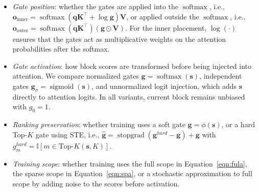 {\setlength{\leftmargini}{2em}
\begin{itemize}
 \item  \textit{Gate position}: whether the gates are applied into the $\operatorname{softmax}$, i.e., $\mathbf{o}_{\text{inner}}=\operatorname{softmax}(\mathbf{q}\mathbf{K}^{\top}+\log\mathbf{g})\mathbf{V}$, or applied outside the $\operatorname{softmax}$, i.e., $\mathbf{o}_{\text{outer}}=\operatorname{softmax}(\mathbf{q}\mathbf{K}^{\top})(\mathbf{g}\odot\mathbf{V})$. For the inner placement, $\log(\cdot)$ ensures that the gates act as multiplicative weights on the attention probabilities after the softmax.

 \item \textit{Gate activation}: how block scores are transformed before being injected into attention. We compare normalized gates $\mathbf{g}=\operatorname{softmax}(\mathbf{s})$, independent gates $\mathbf{g}_{\sigma}=\operatorname{sigmoid}(\mathbf{s})$, and unnormalized logit injection, which adds $\mathbf{s}$ directly to attention logits. In all variants, current block remains unbiased with $g_0=1$.

 \item \textit{Ranking preservation}: whether training uses a soft gate $\mathbf{g}=\phi(\mathbf{s})$, or a hard Top-$K$ gate using STE, i.e., $\hat{\mathbf{g}}=\operatorname{stopgrad}(\mathbf{g}^{hard}-\mathbf{g})+\mathbf{g}$ with $g^{hard}_m=\mathbb{I}[m\in\text{Top-}K(\mathbf{s},K)]$.

  \item \textit{Training scope}: whether training uses the full scope in Equation~\ref{eqn:fula}, the sparse scope in Equation~\ref{eqn:spa}, or a stochastic approximation to full scope by adding noise to the scores before activation.

\end{itemize}
}


